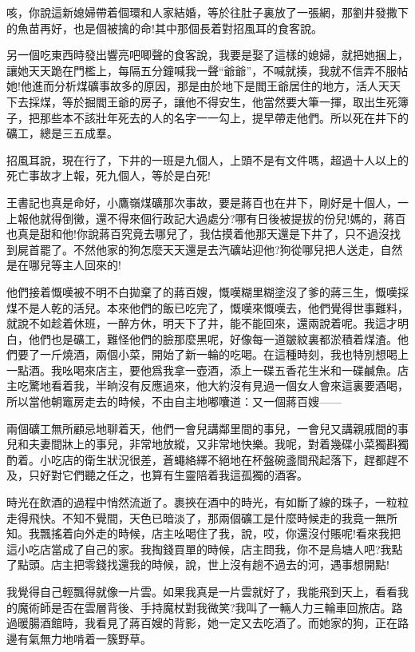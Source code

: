 \documentclass[a6paper]{article}
\begin{document}
咳，你說這新媳婦帶着個環和人家結婚，等於往肚子裏放了一張網，那劉井發撒下的魚苗再好，也是個被擒的命!其中那個長着對招風耳的食客說。

另一個吃東西時發出響亮吧唧聲的食客說，我要是娶了這樣的媳婦，就把她捆上，讓她天天跪在門檻上，每隔五分鐘喊我一聲“爺爺”，不喊就揍，我就不信弄不服帖她!他進而分析煤礦事故多的原因，那是由於地下是閻王爺居住的地方，活人天天下去採煤，等於掘閻王爺的房子，讓他不得安生，他當然要大筆一揮，取出生死簿子，把那些本不該壯年死去的人的名字一一勾上，提早帶走他們。所以死在井下的礦工，總是三五成羣。

招風耳說，現在行了，下井的一班是九個人，上頭不是有文件嗎，超過十人以上的死亡事故才上報，死九個人，等於是白死!

王書記也真是命好，小鷹嶺煤礦那次事故，要是蔣百也在井下，剛好是十個人，一上報他就得倒黴，還不得來個行政記大過處分?哪有日後被提拔的份兒!媽的，蔣百也真是甜和他!你說蔣百究竟去哪兒了，我估摸着他那天還是下井了，只不過沒找到屍首罷了。不然他家的狗怎麼天天還是去汽礦站迎他?狗從哪兒把人送走，自然是在哪兒等主人回來的!

他們接着慨嘆被不明不白拋棄了的蔣百嫂，慨嘆糊里糊塗沒了爹的蔣三生，慨嘆採煤不是人乾的活兒。本來他們的飯已吃完了，慨嘆來慨嘆去，他們覺得世事難料，就說不如趁着休班，一醉方休，明天下了井，能不能回來，還兩說着呢。我這才明白，他們也是礦工，難怪他們的臉那麼黑呢，好像每一道皺紋裏都淤積着煤渣。他們要了一斤燒酒，兩個小菜，開始了新一輪的吃喝。在這種時刻，我也特別想喝上一點酒。我吆喝來店主，要他爲我拿一壺酒，添上一碟五香花生米和一碟鹹魚。店主吃驚地看着我，半晌沒有反應過來，他大約沒有見過一個女人會來這裏要酒喝，所以當他朝竈房走去的時候，不由自主地嘟囔道：又一個蔣百嫂——

兩個礦工無所顧忌地聊着天，他們一會兒講鄰里間的事兒，一會兒又講親戚間的事兒和夫妻間牀上的事兒，非常地放縱，又非常地快樂。我呢，對着幾碟小菜獨斟獨酌着。小吃店的衛生狀況很差，蒼蠅絡繹不絕地在杯盤碗盞間飛起落下，趕都趕不及，只好對它們聽之任之，也算有生靈陪着我這孤獨的酒客。

時光在飲酒的過程中悄然流逝了。裹挾在酒中的時光，有如斷了線的珠子，一粒粒走得飛快。不知不覺間，天色已暗淡了，那兩個礦工是什麼時候走的我竟一無所知。我飄搖着向外走的時候，店主吆喝住了我，說，哎，你還沒付賬呢!看來我把這小吃店當成了自己的家。我掏錢買單的時候，店主問我，你不是烏塘人吧?我點了點頭。店主把零錢找還我的時候，說，世上沒有趟不過去的河，遇事想開點!

我覺得自己輕飄得就像一片雲。如果我真是一片雲就好了，我能飛到天上，看看我的魔術師是否在雲層背後、手持魔杖對我微笑?我叫了一輛人力三輪車回旅店。路過暖腸酒館時，我看見了蔣百嫂的背影，她一定又去吃酒了。而她家的狗，正在路邊有氣無力地啃着一簇野草。
\end{document}
